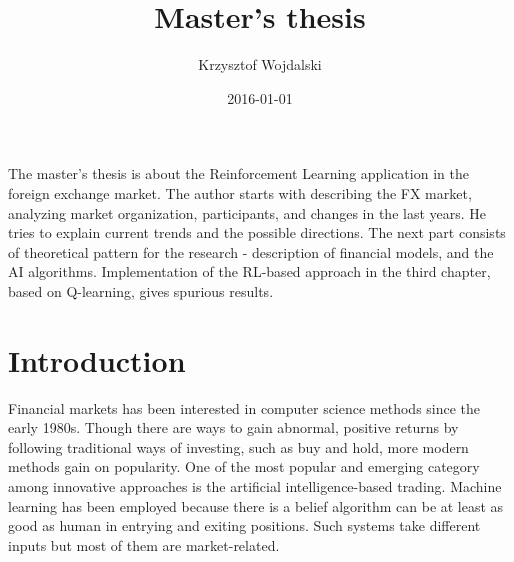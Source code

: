\documentclass{pracamgr_wne}\usepackage[]{graphicx}\usepackage[]{color}
\author{Krzysztof Wojdalski}
\title{Master's thesis}
\date{2016-01-01}
\begin{document}
\maketitle


\begin{summary}

The master's thesis is about the Reinforcement Learning application in the foreign exchange market. 
The author starts with describing the FX market, analyzing market organization, participants, and changes in the last
years. He tries to explain current trends and the possible directions. 
The next part consists of theoretical pattern for the research - description of financial models, 
and the AI algorithms. 
Implementation of the RL-based approach in the third chapter, based on Q-learning, gives spurious results. 


\end{summary}

\tableofcontents



\chapter{Introduction}




Financial markets has been interested in computer science methods since the early 1980s. Though there are ways
to gain abnormal, positive returns by following traditional ways of investing, such as buy and hold, more modern methods gain on popularity. 
One of the most popular and emerging category among innovative approaches is the artificial intelligence-based trading. 
Machine learning has been employed because there is a belief algorithm can be at least as good as human in entrying and
exiting positions. Such systems take different inputs but most of them are market-related.
\end{document}
